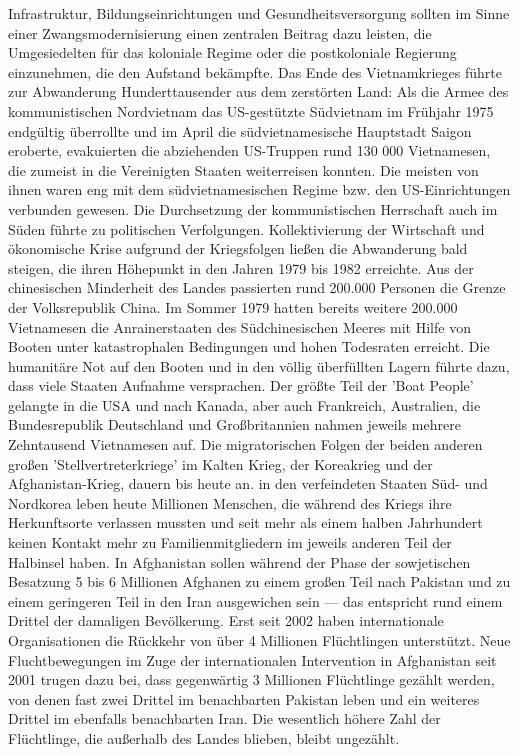 \documentclass[letterpaper, 12pt]{article}
\begin{document}
Infrastruktur, Bildungseinrichtungen und Gesundheitsversorgung sollten im Sinne einer Zwangsmodernisierung einen zentralen Beitrag dazu leisten, die Umgesiedelten für das koloniale Regime oder die postkoloniale Regierung einzunehmen, die den Aufstand bekämpfte. Das Ende des Vietnamkrieges führte zur Abwanderung Hunderttausender aus dem zerstörten Land: Als die Armee des kommunistischen Nordvietnam das US-gestützte Südvietnam im Frühjahr 1975 endgültig überrollte und im April die südvietnamesische Hauptstadt Saigon eroberte, evakuierten die abziehenden US-Truppen rund 130 000 Vietnamesen, die zumeist in die Vereinigten Staaten weiterreisen konnten. Die meisten von ihnen waren eng mit dem südvietnamesischen Regime bzw. den US-Einrichtungen verbunden gewesen. Die Durchsetzung der kommunistischen Herrschaft auch im Süden führte zu politischen Verfolgungen. Kollektivierung der Wirtschaft und ökonomische Krise aufgrund der Kriegsfolgen ließen die Abwanderung bald steigen, die ihren Höhepunkt in den Jahren 1979 bis 1982 erreichte. Aus der chinesischen Minderheit des Landes passierten rund 200.000 Personen die Grenze der Volksrepublik China. Im Sommer 1979 hatten bereits weitere 200.000 Vietnamesen die Anrainerstaaten des Südchinesischen Meeres mit Hilfe von Booten unter katastrophalen Bedingungen und hohen Todesraten erreicht. Die humanitäre Not auf den Booten und in den völlig überfüllten Lagern führte dazu, dass viele Staaten Aufnahme versprachen. Der größte Teil der 'Boat People' gelangte in die USA und nach Kanada, aber auch Frankreich, Australien, die Bundesrepublik Deutschland und Großbritannien nahmen jeweils mehrere Zehntausend Vietnamesen auf. Die migratorischen Folgen der beiden anderen großen 'Stellvertreterkriege' im Kalten Krieg, der Koreakrieg und der Afghanistan-Krieg, dauern bis heute an. in den verfeindeten Staaten Süd- und Nordkorea leben heute Millionen Menschen, die während des Kriegs ihre Herkunftsorte verlassen mussten und seit mehr als einem halben Jahrhundert keinen Kontakt mehr zu Familienmitgliedern im jeweils anderen Teil der Halbinsel haben. In Afghanistan sollen während der Phase der sowjetischen Besatzung 5 bis 6 Millionen Afghanen zu einem großen Teil nach Pakistan und zu einem geringeren Teil in den Iran ausgewichen sein — das entspricht rund einem Drittel der damaligen Bevölkerung. Erst seit 2002 haben internationale Organisationen die Rückkehr von über 4 Millionen Flüchtlingen unterstützt. Neue Fluchtbewegungen im Zuge der internationalen Intervention in Afghanistan seit 2001 trugen dazu bei, dass gegenwärtig 3 Millionen Flüchtlinge gezählt werden, von denen fast zwei Drittel im benachbarten Pakistan leben und ein weiteres Drittel im ebenfalls benachbarten Iran. Die wesentlich höhere Zahl der Flüchtlinge, die außerhalb des Landes blieben, bleibt ungezählt.


\clearpage


\end{document}
